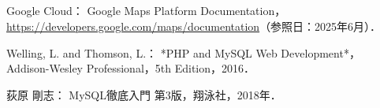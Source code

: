 \begin{center}
	\section*{}                      %
	\vspace*{-2zh}
\end{center}

\begin{thebibliography}{99}

	Google Cloud：
	Google Maps Platform Documentation，
	\url{https://developers.google.com/maps/documentation}（参照日：2025年6月）．

	Welling, L. and Thomson, L.：
	*PHP and MySQL Web Development*，
	Addison-Wesley Professional，5th Edition，2016．

	荻原 剛志：
	MySQL徹底入門 第3版，翔泳社，2018年．

\end{thebibliography}
